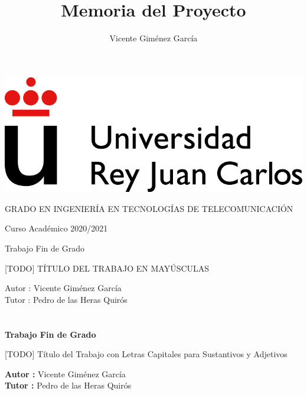 \documentclass[a4paper, 12pt]{book}
\title{Memoria del Proyecto}
\author{Vicente Giménez García}
\begin{document}
\renewcommand{\refname}{Bibliografía}  %
\renewcommand{\appendixname}{Apéndice}


\begin{titlepage}
\begin{center}
\includegraphics[scale=0.8]{img/URJ_logo_Color_POS.png}

\vspace{1.75cm}

\Large
GRADO EN INGENIERÍA EN TECNOLOGÍAS DE TELECOMUNICACIÓN

\vspace{0.4cm}

\large
Curso Académico 2020/2021

\vspace{0.8cm}

Trabajo Fin de Grado

\vspace{2.5cm}

\LARGE
[TODO] TÍTULO DEL TRABAJO EN MAYÚSCULAS

\vspace{4cm}

\large
Autor : Vicente Giménez García \\
Tutor : Pedro de las Heras Quirós
\end{center}
\end{titlepage}

\newpage
\mbox{}
\thispagestyle{empty} %


\clearpage
{}
\chapter*{}

\vspace{-4cm}
\begin{center}
\LARGE
\textbf{Trabajo Fin de Grado}

\vspace{1cm}
\large
[TODO] Título del Trabajo con Letras Capitales para Sustantivos y Adjetivos

\vspace{1cm}
\large
\textbf{Autor :} Vicente Giménez García \\
\textbf{Tutor :} Pedro de las Heras Quirós

\end{center}
\end{document}
